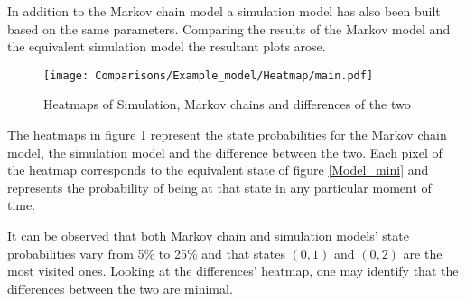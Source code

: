 In addition to the Markov chain model a simulation model has also been built based on the same parameters. Comparing the results of the Markov model and the equivalent simulation model the resultant plots arose.

\begin{figure}
    \texttt{[image: Comparisons/Example\_model/Heatmap/main.pdf]}
    \caption{Heatmaps of Simulation, Markov chains and differences of the two}
    \label{Heatmap_mini}
\end{figure}

The heatmaps in figure \ref{Heatmap_mini} represent the state probabilities for the Markov chain model, the simulation model and the difference between the two. Each pixel of the heatmap corresponds to the equivalent state of figure \ref{Model_mini} and represents the probability of being at that state in any particular moment of time.

It can be observed that both Markov chain and simulation models' state probabilities vary from 5\% to 25\% and that states \( (0, 1) \) and \( (0, 2) \) are the most visited ones. Looking at the differences' heatmap, one may identify that the differences between the two are minimal.

